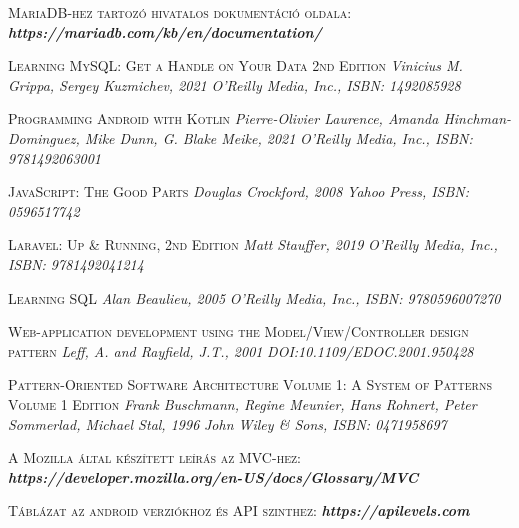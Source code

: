 \documentclass[
]{thesis-ekf}
\theoremstyle{definition}
\theoremstyle{remark}
\begin{document}
\begin{thebibliography}{2}
\textsc{MariaDB-hez tartozó hivatalos dokumentáció oldala:}
\newline
\emph{\bf{https://mariadb.com/kb/en/documentation/}}

\textsc{Learning MySQL: Get a Handle on Your Data 2nd Edition}
\newline
\emph{Vinicius M. Grippa, Sergey Kuzmichev,  2021}
\emph{O'Reilly Media, Inc., ISBN: 1492085928}

\textsc{Programming Android with Kotlin}
\newline
\emph{Pierre-Olivier Laurence, Amanda Hinchman-Dominguez, Mike Dunn, G. Blake Meike,  2021}
\emph{O'Reilly Media, Inc., ISBN: 9781492063001}

\textsc{JavaScript: The Good Parts}
\newline
\emph{Douglas Crockford, 2008}
\emph{Yahoo Press, ISBN: 0596517742}

\textsc{Laravel: Up \& Running, 2nd Edition}
\newline
\emph{Matt Stauffer, 2019}
\emph{O'Reilly Media, Inc., ISBN: 9781492041214}

\textsc{Learning SQL}
\newline
\emph{Alan Beaulieu, 2005}
\emph{O'Reilly Media, Inc., ISBN: 9780596007270}

\textsc{Web-application development using the Model/View/Controller design pattern}
\newline
\emph{Leff, A. and Rayfield, J.T., 2001}
\emph{DOI:10.1109/EDOC.2001.950428}

\textsc{Pattern-Oriented Software Architecture Volume 1: A System of Patterns Volume 1 Edition}
\newline
\emph{Frank Buschmann, Regine Meunier, Hans Rohnert, Peter Sommerlad, Michael Stal, 1996}
\emph{John Wiley \& Sons, ISBN: 0471958697}

\textsc{A Mozilla által készített leírás az MVC-hez:}
\newline
\emph{\bf{https://developer.mozilla.org/en-US/docs/Glossary/MVC}}

\textsc{Táblázat az android verziókhoz és API szinthez:}
\newline
\emph{\bf{https://apilevels.com}}

\end{thebibliography}

%
\end{document}
